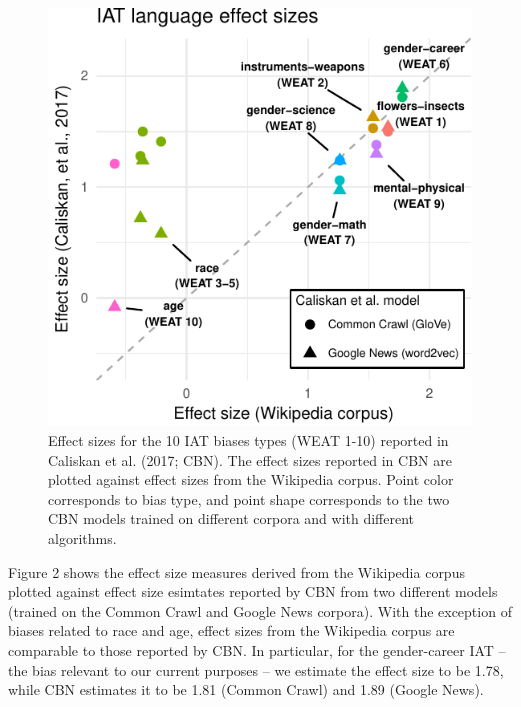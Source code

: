 \documentclass[10pt, letterpaper]{article}
\newenvironment{CodeChunk}{}{}
\begin{document}
\begin{CodeChunk}
\begin{figure}[t]

{\centering \includegraphics{figs/WEAT_plot-1} 

}

\caption[Effect sizes for the 10 IAT biases types (WEAT 1-10) reported in Caliskan et al]{Effect sizes for the 10 IAT biases types (WEAT 1-10) reported in Caliskan et al. (2017; CBN). The effect sizes reported in CBN are plotted against  effect sizes from the Wikipedia corpus.  Point color corresponds to  bias type, and point shape corresponds to the two CBN models trained on different corpora and with different algorithms.}\label{fig:WEAT_plot}
\end{figure}
\end{CodeChunk}

Figure 2 shows the effect size measures derived from the Wikipedia
corpus plotted against effect size esimtates reported by CBN from two
different models (trained on the Common Crawl and Google News corpora).
With the exception of biases related to race and age, effect sizes from
the Wikipedia corpus are comparable to those reported by CBN. In
particular, for the gender-career IAT -- the bias relevant to our
current purposes -- we estimate the effect size to be 1.78, while CBN
estimates it to be 1.81 (Common Crawl) and 1.89 (Google News).
\end{document}
